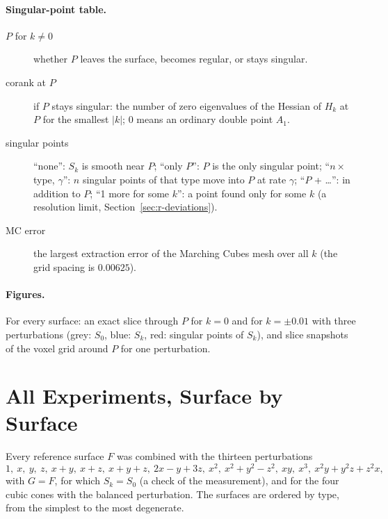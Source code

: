 \documentclass[12pt, a4paper]{article}
\theoremstyle{plain}
\theoremstyle{definition}
\theoremstyle{remark}
\theoremstyle{definition}
\begin{document}
\paragraph{Singular-point table.}
\begin{description}
    \item[$P$ for $k\neq0$] whether $P$ leaves the surface, becomes regular, or stays
          singular.
    \item[corank at $P$] if $P$ stays singular: the number of zero eigenvalues of the
          Hessian of $H_k$ at $P$ for the smallest $|k|$; $0$ means an ordinary double
          point $A_1$.
    \item[singular points] ``none'': $S_k$ is smooth near $P$; ``only $P$'': $P$ is the
          only singular point; ``$n\times$type, $\gamma$'': $n$ singular points of that
          type move into $P$ at rate $\gamma$; ``$P$ + \dots'': in addition to $P$;
          ``1 more for some $k$'': a point found only for some $k$ (a resolution limit,
          Section~\ref{sec:r-deviations}).
    \item[MC error] the largest extraction error of the Marching Cubes mesh over all
          $k$ (the grid spacing is $0.00625$).
\end{description}

\paragraph{Figures.} For every surface: an exact slice through $P$ for $k=0$ and for
$k=\pm0.01$ with three perturbations (grey: $S_0$, blue: $S_k$, red: singular points
of $S_k$), and slice snapshots of the voxel grid around $P$ for one perturbation.

\section{All Experiments, Surface by Surface}
\label{sec:r-surfaces}

Every reference surface $F$ was combined with the thirteen perturbations
\[
1,\ x,\ y,\ z,\ x+y,\ x+z,\ x+y+z,\ 2x-y+3z,\ x^2,\ x^2+y^2-z^2,\ xy,\ x^3,\ x^2y+y^2z+z^2x,
\]
with $G=F$, for which $S_k=S_0$ (a check of the measurement), and for the four cubic
cones with the balanced perturbation. The surfaces are ordered by type, from the
simplest to the most degenerate.
\end{document}
